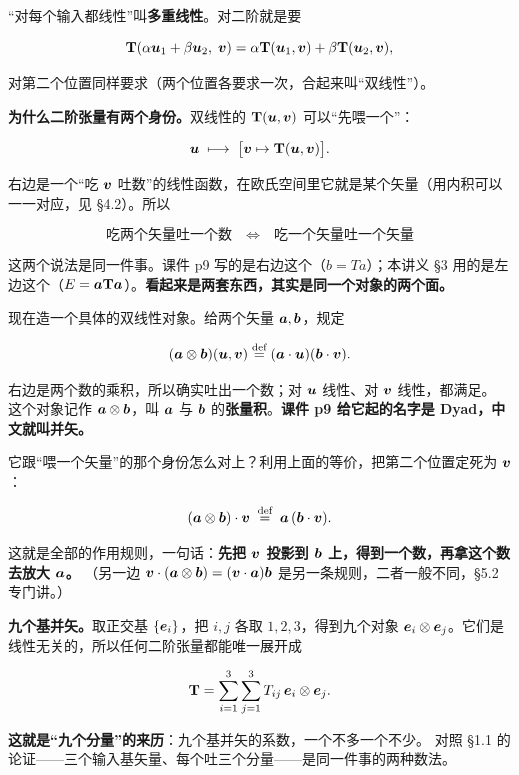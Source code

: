 \documentclass[11pt]{ctexart}
\newcommand{\ten}[1]{\mathbf{#1}}
\let\origsubhdr\subhdr
\renewcommand{\subhdr}[1]{\par\needspace{3\baselineskip}\origsubhdr{#1}}
\begin{document}
“对每个输入都线性”叫\textbf{多重线性}。对二阶就是要

\[
\ten T(\alpha\vect u_1+\beta\vect u_2,\;\vect v)=\alpha\ten T(\vect u_1,\vect v)+\beta\ten T(\vect u_2,\vect v),
\]

对第二个位置同样要求（两个位置各要求一次，合起来叫“双线性”）。

\textbf{为什么二阶张量有两个身份。}双线性的 $\ten T(\vect u,\vect v)$ 可以“先喂一个”：

\[
\vect u\;\longmapsto\;\bigl[\vect v\mapsto\ten T(\vect u,\vect v)\bigr] .
\]

右边是一个“吃 $\boldsymbol{v}$ 吐数”的线性函数，在欧氏空间里它就是某个矢量（用内积可以一一对应，见 §4.2）。所以

\[
\boxed{\;\text{吃两个矢量吐一个数}\quad\Longleftrightarrow\quad\text{吃一个矢量吐一个矢量}\;}
\]

这两个说法是同一件事。课件 p9 写的是右边这个（$b=Ta$）；本讲义 §3 用的是左边这个（$E=\vect a\ten T\vect a$）。\textbf{看起来是两套东西，其实是同一个对象的两个面。}


现在造一个具体的双线性对象。给两个矢量 $\boldsymbol{a},\boldsymbol{b}$，规定

\[
(\boldsymbol{a}\otimes\boldsymbol{b})(\boldsymbol{u},\boldsymbol{v})\stackrel{\text{def}}{=}(\boldsymbol{a}\cdot\boldsymbol{u})(\boldsymbol{b}\cdot\boldsymbol{v}).
\]

右边是两个数的乘积，所以确实吐出一个数；对 $\boldsymbol{u}$ 线性、对 $\boldsymbol{v}$ 线性，都满足。
这个对象记作 $\boldsymbol{a}\otimes\boldsymbol{b}$，叫 $\boldsymbol{a}$ 与 $\boldsymbol{b}$ 的\textbf{张量积}。\textbf{课件 p9 给它起的名字是 Dyad，中文就叫并矢。}

它跟“喂一个矢量”的那个身份怎么对上？利用上面的等价，把第二个位置定死为 $\boldsymbol{v}$：

\[
(\boldsymbol{a}\otimes\boldsymbol{b})\cdot\boldsymbol{v}\;\stackrel{\text{def}}{=}\;\boldsymbol{a}\,(\boldsymbol{b}\cdot\boldsymbol{v}).
\]

这就是全部的作用规则，一句话：\textbf{先把 $\boldsymbol{v}$ 投影到 $\boldsymbol{b}$ 上，得到一个数，再拿这个数去放大 $\boldsymbol{a}$。}
（另一边 $\boldsymbol{v}\cdot(\boldsymbol{a}\otimes\boldsymbol{b})=(\boldsymbol{v}\cdot\boldsymbol{a})\boldsymbol{b}$ 是另一条规则，二者一般不同，§5.2 专门讲。）

\textbf{九个基并矢。}取正交基 $\{\boldsymbol{e}_i\}$，把 $i,j$ 各取 $1,2,3$，得到九个对象 $\boldsymbol{e}_i\otimes\boldsymbol{e}_j$。它们是线性无关的，所以任何二阶张量都能唯一展开成

\[
\ten T=\sum_{i=1}^{3}\sum_{j=1}^{3}T_{ij}\,\vect e_i\otimes\vect e_j .
\]

\textbf{这就是“九个分量”的来历}：九个基并矢的系数，一个不多一个不少。
对照 §1.1 的论证——三个输入基矢量、每个吐三个分量——是同一件事的两种数法。
\end{document}
